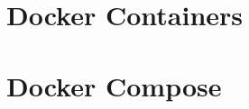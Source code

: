 \documentclass[10pt, compress, aspectratio=169, xcolor={table,usenames,dvipsnames}]{beamer}
\begin{document}
\section{Docker Containers}
\label{sec:orgd52a3ec}
\section{Docker Compose}
\label{sec:orgaa8d9fe}
\end{document}
